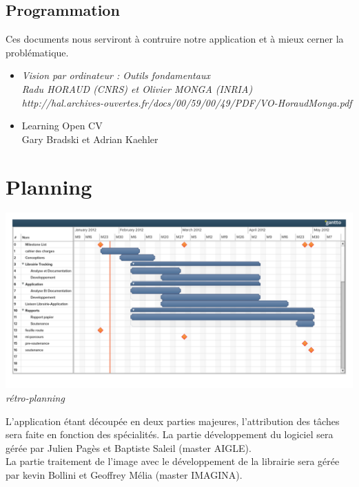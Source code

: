 \documentclass{article}
\begin{document}
	\subsection{Programmation}
	Ces documents nous serviront à contruire notre application et à mieux cerner la problématique. \\	
	\begin{itemize}
		\item \it{Vision par ordinateur : Outils fondamentaux} \\
		Radu HORAUD (CNRS) et Olivier MONGA (INRIA) \\
		http://hal.archives-ouvertes.fr/docs/00/59/00/49/PDF/VO-HoraudMonga.pdf
		
		\item Learning Open CV \\
		 Gary Bradski et Adrian Kaehler
	\end{itemize}

	\section{Planning}
	\begin{center}
		\includegraphics[scale=0.37]{retroplanning.pdf}
		\it rétro-planning
	\end{center}
	
	L'application étant découpée en deux parties majeures, l'attribution des tâches sera faite en fonction des spécialités.
	La partie développement du logiciel sera gérée par Julien Pagès et Baptiste Saleil (master AIGLE). \\
	La partie traitement de l'image avec le développement de la librairie sera gérée par kevin Bollini et Geoffrey Mélia 
	(master IMAGINA).	
\end{document}
